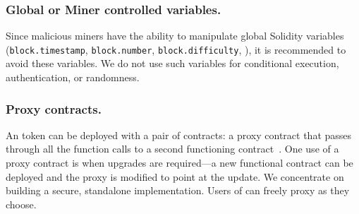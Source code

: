 \subsubsection{Global or Miner controlled variables.}

Since malicious miners have the ability to manipulate global Solidity variables (\eg \texttt{block.timestamp}, \texttt{block.number}, \texttt{block.difficulty}, \etc), it is recommended to avoid these variables. We do not use such variables for conditional execution, authentication, or randomness.

\subsubsection{Proxy contracts.}

An \erc token can be deployed with a pair of contracts: a proxy contract that passes through all the function calls to a second functioning \erc contract~\cite{ProxyContract,ProxyPatterns}. One use of a proxy contract is when upgrades are required---a new functional contract can be deployed and the proxy is modified to point at the update. We concentrate on building a secure, standalone implementation. Users of \sys can freely proxy \sys as they choose. 




